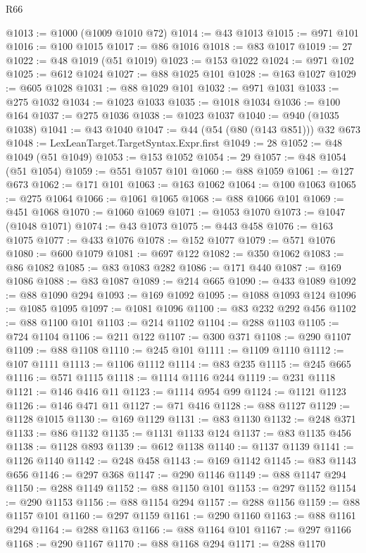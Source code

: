 \begin{lexlean}{R66}
\begin{coremodule}
@1013 := @1000 (@1009 @1010 @72)
@1014 := @43 @1013
@1015 := @971 @101
@1016 := @100 @1015
@1017 := @86 @1016
@1018 := @83 @1017
@1019 := 27
@1022 := @48 @1019 (@51 @1019)
@1023 := @153 @1022
@1024 := @971 @102
@1025 := @612 @1024
@1027 := @88 @1025 @101
@1028 := @163 @1027
@1029 := @605 @1028
@1031 := @88 @1029 @101
@1032 := @971 @1031
@1033 := @275 @1032
@1034 := @1023 @1033
@1035 := @1018 @1034
@1036 := @100 @164
@1037 := @275 @1036
@1038 := @1023 @1037
@1040 := @940 (@1035 @1038)
@1041 := @43 @1040
@1047 := @44 (@54 (@80 (@143 @851))) @32 @673
@1048 := LexLeanTarget.TargetSyntax.Expr.first
@1049 := 28
@1052 := @48 @1049 (@51 @1049)
@1053 := @153 @1052
@1054 := 29
@1057 := @48 @1054 (@51 @1054)
@1059 := @551 @1057 @101
@1060 := @88 @1059
@1061 := @127 @673
@1062 := @171 @101
@1063 := @163 @1062
@1064 := @100 @1063
@1065 := @275 @1064
@1066 := @1061 @1065
@1068 := @88 @1066 @101
@1069 := @451 @1068
@1070 := @1060 @1069
@1071 := @1053 @1070
@1073 := @1047 (@1048 @1071)
@1074 := @43 @1073
@1075 := @443 @458
@1076 := @163 @1075
@1077 := @433 @1076
@1078 := @152 @1077
@1079 := @571 @1076
@1080 := @600 @1079
@1081 := @697 @122
@1082 := @350 @1062
@1083 := @86 @1082
@1085 := @83 @1083 @282
@1086 := @171 @440
@1087 := @169 @1086
@1088 := @83 @1087
@1089 := @214 @665
@1090 := @433 @1089
@1092 := @88 @1090 @294
@1093 := @169 @1092
@1095 := @1088 @1093 @124
@1096 := @1085 @1095
@1097 := @1081 @1096
@1100 := @83 @232 @292 @456
@1102 := @88 @1100 @101
@1103 := @214 @1102
@1104 := @288 @1103
@1105 := @724 @1104
@1106 := @211 @122
@1107 := @300 @371
@1108 := @290 @1107
@1109 := @88 @1108
@1110 := @245 @101
@1111 := @1109 @1110
@1112 := @107 @1111
@1113 := @1106 @1112
@1114 := @83 @235
@1115 := @245 @665
@1116 := @571 @1115
@1118 := @1114 @1116 @244
@1119 := @231 @1118
@1121 := @146 @416 @11
@1123 := @1114 @954 @99
@1124 := @1121 @1123
@1126 := @146 @471 @11
@1127 := @71 @416
@1128 := @88 @1127
@1129 := @1128 @1015
@1130 := @169 @1129
@1131 := @83 @1130
@1132 := @248 @371
@1133 := @86 @1132
@1135 := @1131 @1133 @124
@1137 := @83 @1135 @456
@1138 := @1128 @893
@1139 := @612 @1138
@1140 := @1137 @1139
@1141 := @1126 @1140
@1142 := @248 @458
@1143 := @169 @1142
@1145 := @83 @1143 @656
@1146 := @297 @368
@1147 := @290 @1146
@1149 := @88 @1147 @294
@1150 := @288 @1149
@1152 := @88 @1150 @101
@1153 := @297 @1152
@1154 := @290 @1153
@1156 := @88 @1154 @294
@1157 := @288 @1156
@1159 := @88 @1157 @101
@1160 := @297 @1159
@1161 := @290 @1160
@1163 := @88 @1161 @294
@1164 := @288 @1163
@1166 := @88 @1164 @101
@1167 := @297 @1166
@1168 := @290 @1167
@1170 := @88 @1168 @294
@1171 := @288 @1170

\end{coremodule}
\end{lexlean}

